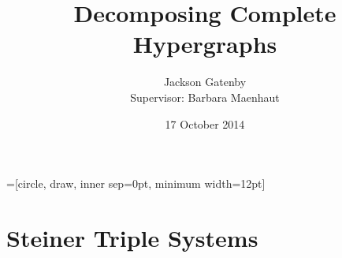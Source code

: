 {

}

\usepackage[english]{babel}
\usepackage[latin1]{inputenc}

\usepackage{mathptmx}
\usepackage[scaled=.90]{helvet}
\usepackage{courier}

\usepackage[T1]{fontenc}

\usepackage{amsmath}
\usepackage{amssymb}
\usepackage{thmtools}

\usepackage{tikz}
\usetikzlibrary[topaths]
=[circle, draw, %
                        inner sep=0pt, minimum width=12pt]
\newcount\mycount

\usepackage{wasysym}

\let\problem\relax
{}
\theoremstyle{definition}
\newtheorem{question}[theorem]{}

\newcommand{\floor}[1]{\left \lfloor #1 \right \rfloor}

\title{Decomposing Complete Hypergraphs}


\author{Jackson Gatenby \\ \vspace{0.3cm} Supervisor: Barbara Maenhaut}

\date{17 October 2014}






\begin{frame}
\titlepage
\end{frame}

\section{Steiner Triple Systems}

